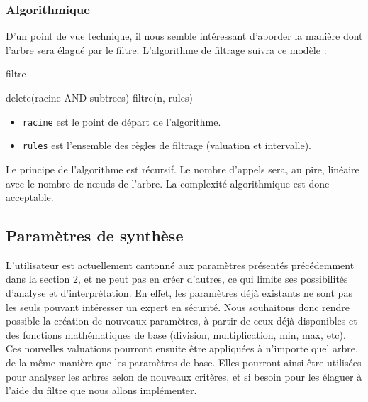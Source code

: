 			\subsubsection{Algorithmique}
		D'un point de vue technique, il nous semble intéressant d'aborder la manière dont l'arbre sera élagué par le filtre.
		L'algorithme de filtrage suivra ce modèle :

		\begin{algorithm}[h!]
			\caption{filtre}
		\begin{algorithmic}
						\STATE delete(racine AND subtrees)
						\RETURN
					\ENDIF
				\ENDFOR
					\STATE filtre(n, rules)
				\ENDFOR

		\end{algorithmic}
		\end{algorithm}

		\begin{itemize}
		 \item \verb|racine| est le point de départ de l'algorithme.
		 \item \verb|rules| est l'ensemble des règles de filtrage (valuation et intervalle).
		\end{itemize}
	
		Le principe de l'algorithme est récursif.
		Le nombre d'appels sera, au pire, linéaire avec le nombre de nœuds de l'arbre.
		La complexité algorithmique est donc acceptable.

		\subsection{Paramètres de synthèse}
		\label{subsection:synthese} 

			L'utilisateur est actuellement cantonné aux paramètres présentés précédemment dans la section 2, et ne peut pas en créer d'autres, ce qui limite ses possibilités d'analyse et d'interprétation. En effet, les paramètres déjà existants ne sont pas les seuls pouvant intéresser un expert en sécurité. Nous souhaitons donc rendre possible la création de nouveaux paramètres, à partir de ceux déjà disponibles et des fonctions mathématiques de base (division, multiplication, min, max, etc). Ces nouvelles valuations pourront ensuite être appliquées à n'importe quel arbre, de la même manière que les paramètres de base. Elles pourront ainsi être utilisées pour analyser les arbres selon de nouveaux critères, et si besoin pour les élaguer à l'aide du filtre que nous allons implémenter.\\


